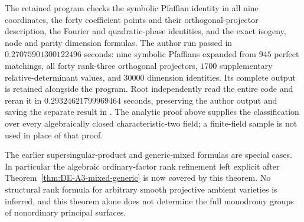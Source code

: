 \begin{remark}
\label{rem:DE-A3-ppav-rank-checks}
The retained program
checks the symbolic Pfaffian identity in all nine coordinates, the
forty coefficient points and their orthogonal-projector description,
the Fourier and quadratic-phase identities, and the exact isogeny,
node and parity dimension formulas.  The author run passed in
$0.27075901300122496$ seconds: nine symbolic Pfaffians expanded from
$945$ perfect matchings, all forty rank-three orthogonal projectors,
$1700$ supplementary relative-determinant values, and $30000$ dimension
identities.  Its complete output is retained alongside the program.
Root independently read the entire code and reran it in
$0.29324621799969464$ seconds, preserving the author output and saving
the separate result in .
The analytic proof above supplies the classification
over every algebraically closed characteristic-two field; a finite-field
sample is not used in place of that proof.

The earlier supersingular-product and generic-mixed formulas are
special cases.  In particular the algebraic ordinary-factor rank
refinement left explicit after Theorem~\ref{thm:DE-A3-mixed-generic}
is now covered by this theorem.
No structural rank formula for arbitrary smooth projective ambient
varieties is inferred, and this theorem alone does not determine the
full monodromy groups of nonordinary principal surfaces.
\end{remark}

